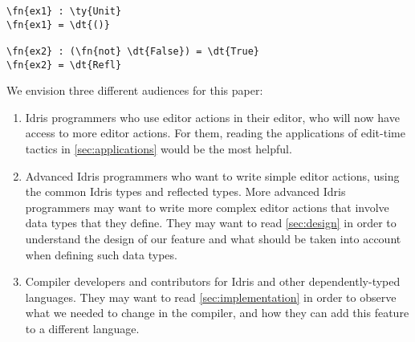 
\begin{Verbatim}
\fn{ex1} : \ty{Unit}
\fn{ex1} = \dt{()}

\fn{ex2} : (\fn{not} \dt{False}) = \dt{True}
\fn{ex2} = \dt{Refl}
\end{Verbatim}




We envision three different audiences for this paper:
\begin{enumerate}[(1)]
\item Idris programmers who use editor actions in their editor, who will now
  have access to more editor actions. For them, reading the applications of
edit-time tactics in \autoref{sec:applications} would be the most helpful.
\item Advanced Idris programmers who want to write simple editor actions, using
  the common Idris types and reflected types. More advanced Idris programmers
    may want to write more complex editor actions that involve data types
    that they define.
    They may want to read \autoref{sec:design} in order to understand the
    design of our feature and what should be taken into account when defining
    such data types.
\item Compiler developers and contributors for Idris and other
  dependently-typed languages.  They may want to read
    \autoref{sec:implementation} in order to observe what we needed to change
    in the compiler, and how they can add this feature to a different language.
\end{enumerate}

